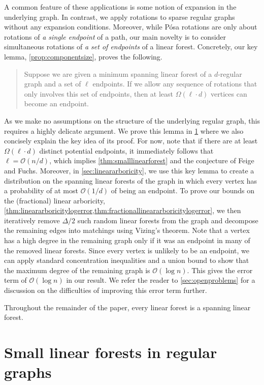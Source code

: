 \documentclass[11pt]{article}
\theoremstyle{plain}
\theoremstyle{definition}
\newcommand{\cO}{\mathcal O}
\begin{document}
A common feature of these applications is some notion of expansion in the underlying graph. In contrast, we apply rotations to sparse regular graphs without any expansion conditions. Moreover, while P\'{o}sa rotations are only about rotations of \emph{a single endpoint} of a path, our main novelty is to consider simultaneous rotations of \emph{a set of endpoints} of a linear forest. Concretely, our key lemma, \cref{prop:componentsize}, proves the following.
\begin{quote}
    Suppose we are given a minimum spanning linear forest of a $d$-regular graph and a set of $\ell$ endpoints. If we allow any sequence of rotations that only involves this set of endpoints, then at least $\Omega(\ell\cdot d)$ vertices can become an endpoint.
\end{quote}
As we make no assumptions on the structure of the underlying regular graph, this requires a highly delicate argument. We prove this lemma in \cref{sec:smalllinearforests} where we also concisely explain the key idea of its proof. For now, note that if there are at least $\Omega(\ell \cdot d)$ distinct potential endpoints, it immediately follows that $\ell = \cO(n/d)$, which implies \cref{thm:smalllinearforest} and the conjecture of Feige and Fuchs. Moreover, in \cref{sec:lineararboricity}, we use this key lemma to create a distribution on the spanning linear forests of the graph in which every vertex has a probability of at most $\cO(1/d)$ of being an endpoint. To prove our bounds on the (fractional) linear arboricity, \cref{thm:lineararboricitylogerror,thm:fractionallineararboricitylogerror}, we then iteratively remove $\Delta/2$ such random linear forests from the graph and decompose the remaining edges into matchings using Vizing's theorem. Note that a vertex has a high degree in the remaining graph only if it was an endpoint in many of the removed linear forests. Since every vertex is unlikely to be an endpoint, we can apply standard concentration inequalities and a union bound to show that the maximum degree of the remaining graph is $\cO(\log n)$. This gives the error term of $\cO(\log n)$ in our result. We refer the reader to \cref{sec:openproblems} for a discussion on the difficulties of improving this error term further.

Throughout the remainder of the paper, every linear forest is a spanning linear forest.

\section{Small linear forests in regular graphs}\label{sec:smalllinearforests}
\end{document}
